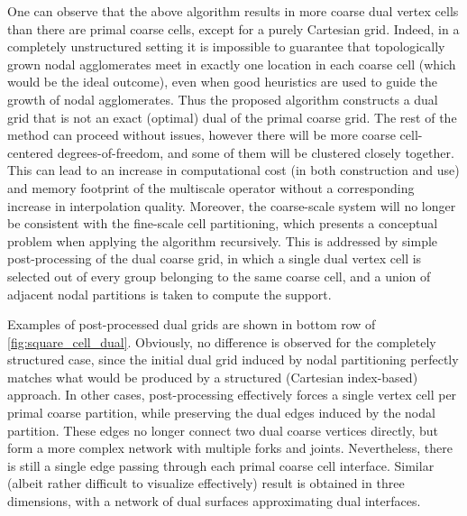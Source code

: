 One can observe that the above algorithm results in more coarse dual vertex cells than there are primal coarse cells, except for a purely Cartesian grid.   Indeed, in a completely unstructured setting it is impossible to guarantee that topologically grown nodal agglomerates meet in exactly one location in each coarse cell (which would be the ideal outcome), even when good heuristics are used to guide the growth of nodal agglomerates.   Thus the proposed algorithm constructs a dual grid that is not an exact (optimal) dual of the primal coarse grid.    The rest of the method can proceed without issues, however there will be more coarse cell-centered degrees-of-freedom, and some of them will be clustered closely together.   This can lead to an increase in computational cost (in both construction and use) and memory footprint of the multiscale operator without a corresponding increase in interpolation quality.   Moreover, the coarse-scale system will no longer be consistent with the fine-scale cell partitioning, which presents a conceptual problem when applying the algorithm recursively.    This is addressed by simple post-processing of the dual coarse grid, in which a single dual vertex cell is selected out of every group belonging to the same coarse cell, and a union of adjacent nodal partitions is taken to compute the support.

Examples of post-processed dual grids are shown in bottom row of \autoref{fig:square_cell_dual}.   Obviously, no difference is observed for the completely structured case, since the initial dual grid induced by nodal partitioning perfectly matches what would be produced by a structured (Cartesian index-based) approach.   In other cases, post-processing effectively forces a single vertex cell per primal coarse partition, while preserving the dual edges induced by the nodal partition.   These edges no longer connect two dual coarse vertices directly, but form a more complex network with multiple forks and joints.   Nevertheless, there is still a single edge passing through each primal coarse cell interface.    Similar (albeit rather difficult to visualize effectively) result is obtained in three dimensions, with a network of dual surfaces approximating dual interfaces.


